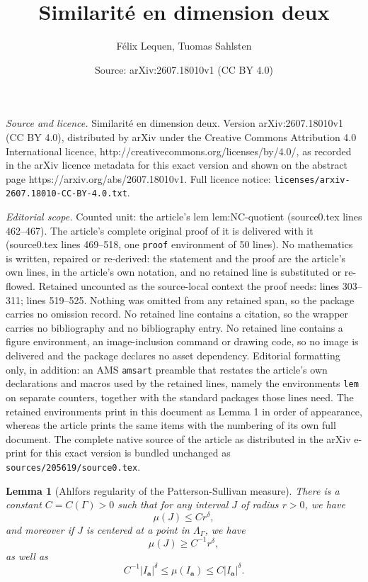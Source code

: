 \documentclass[10pt,a4paper]{amsart}
\title{Similarité en dimension deux}
\author{F\'elix Lequen, Tuomas Sahlsten}
\date{Source: arXiv:2607.18010v1 (CC BY 4.0)}
\newtheorem{lem}{Lemma}
\newcommand*\abs[1]{
	\left|#1\right|
}
\renewcommand{\geq}{\geqslant}
\renewcommand{\leq}{\leqslant}
\begin{document}
\maketitle

\noindent\emph{Source and licence.} Similarité en dimension deux. Version arXiv:2607.18010v1 (CC BY 4.0), distributed by arXiv under the Creative Commons Attribution 4.0 International licence, http://creativecommons.org/licenses/by/4.0/, as recorded in the arXiv licence metadata for this exact version and shown on the abstract page https://arxiv.org/abs/2607.18010v1. Full licence notice: \texttt{licenses/arxiv-2607.18010-CC-BY-4.0.txt}.\par\smallskip

\noindent\textit{Editorial scope.} Counted unit: the article's lem lem:NC-quotient (source0.tex lines 462--467). The article's complete original proof of it is delivered with it (source0.tex lines 469--518, one \texttt{proof} environment of 50 lines). No mathematics is written, repaired or re-derived: the statement and the proof are the article's own lines, in the article's own notation, and no retained line is substituted or re-flowed.  Retained uncounted as the source-local context the proof needs: lines 303--311; lines 519--525.  Nothing was omitted from any retained span, so the package carries no omission record.  No retained line contains a citation, so the wrapper carries no bibliography and no bibliography entry.  No retained line contains a figure environment, an image-inclusion command or drawing code, so no image is delivered and the package declares no asset dependency.  Editorial formatting only, in addition: an AMS \texttt{amsart} preamble that restates the article's own declarations and macros used by the retained lines, namely the environments \texttt{lem} on separate counters, together with the standard packages those lines need.  The retained environments print in this document as Lemma 1 in order of appearance, whereas the article prints the same items with the numbering of its own full document.  The complete native source of the article as distributed in the arXiv e-print for this exact version is bundled unchanged as \texttt{sources/205619/source0.tex}.
\begin{lem}[Ahlfors regularity of the Patterson-Sullivan measure]
\label{lem:ahlfors-regularity}
There is a constant $C = C(\Gamma) >0$ such that for any interval $J$ of radius $r > 0$, we have
\[\mu(J) \leq Cr^\delta,\]
and moreover if $J$ is centered at a point in $\Lambda_\Gamma$, we have
\[\mu(J) \geq C^{-1}r^\delta,\]
as well as
\[C^{-1}\abs{I_\mathbf{a}}^\delta \leq \mu(I_\mathbf{a}) \leq C\abs{I_\mathbf{a}}^\delta.\]
\end{lem}
\end{document}
